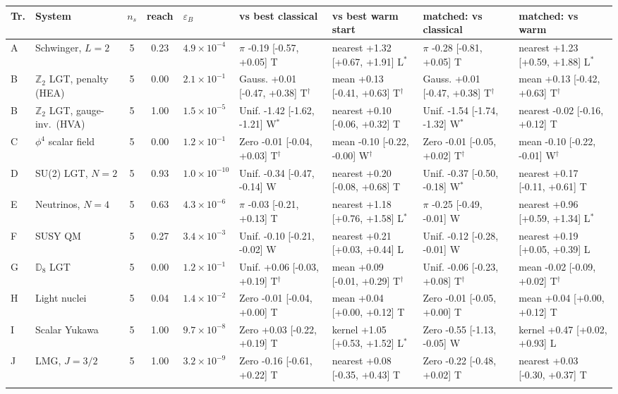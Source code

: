 \begin{tabular}{@{}llcclllll@{}}
\toprule
Tr. & System & $n_s$ & reach & $\varepsilon_B$ & vs best classical & vs best warm start & matched: vs classical & matched: vs warm \\
\midrule
A & Schwinger, $L{=}2$ & 5 & 0.23 & $4.9\!\times\!10^{-4}$ & $\pi$ -0.19 [-0.57, +0.05] T & nearest +1.32 [+0.67, +1.91] L$^\ast$ & $\pi$ -0.28 [-0.81, +0.05] T & nearest +1.23 [+0.59, +1.88] L$^\ast$ \\
B & $\mathbb{Z}_2$ LGT, penalty (HEA) & 5 & 0.00 & $2.1\!\times\!10^{-1}$ & Gauss. +0.01 [-0.47, +0.38] T$^\dagger$ & mean +0.13 [-0.41, +0.63] T$^\dagger$ & Gauss. +0.01 [-0.47, +0.38] T$^\dagger$ & mean +0.13 [-0.42, +0.63] T$^\dagger$ \\
B & $\mathbb{Z}_2$ LGT, gauge-inv.\ (HVA) & 5 & 1.00 & $1.5\!\times\!10^{-5}$ & Unif. -1.42 [-1.62, -1.21] W$^\ast$ & nearest +0.10 [-0.06, +0.32] T & Unif. -1.54 [-1.74, -1.32] W$^\ast$ & nearest -0.02 [-0.16, +0.12] T \\
C & $\phi^4$ scalar field & 5 & 0.00 & $1.2\!\times\!10^{-1}$ & Zero -0.01 [-0.04, +0.03] T$^\dagger$ & mean -0.10 [-0.22, -0.00] W$^\dagger$ & Zero -0.01 [-0.05, +0.02] T$^\dagger$ & mean -0.10 [-0.22, -0.01] W$^\dagger$ \\
D & SU(2) LGT, $N{=}2$ & 5 & 0.93 & $1.0\!\times\!10^{-10}$ & Unif. -0.34 [-0.47, -0.14] W & nearest +0.20 [-0.08, +0.68] T & Unif. -0.37 [-0.50, -0.18] W$^\ast$ & nearest +0.17 [-0.11, +0.61] T \\
E & Neutrinos, $N{=}4$ & 5 & 0.63 & $4.3\!\times\!10^{-6}$ & $\pi$ -0.03 [-0.21, +0.13] T & nearest +1.18 [+0.76, +1.58] L$^\ast$ & $\pi$ -0.25 [-0.49, -0.01] W & nearest +0.96 [+0.59, +1.34] L$^\ast$ \\
F & SUSY QM & 5 & 0.27 & $3.4\!\times\!10^{-3}$ & Unif. -0.10 [-0.21, -0.02] W & nearest +0.21 [+0.03, +0.44] L & Unif. -0.12 [-0.28, -0.01] W & nearest +0.19 [+0.05, +0.39] L \\
G & $\mathbb{D}_8$ LGT & 5 & 0.00 & $1.2\!\times\!10^{-1}$ & Unif. +0.06 [-0.03, +0.19] T$^\dagger$ & mean +0.09 [-0.01, +0.29] T$^\dagger$ & Unif. -0.06 [-0.23, +0.08] T$^\dagger$ & mean -0.02 [-0.09, +0.02] T$^\dagger$ \\
H & Light nuclei & 5 & 0.04 & $1.4\!\times\!10^{-2}$ & Zero -0.01 [-0.04, +0.00] T & mean +0.04 [+0.00, +0.12] T & Zero -0.01 [-0.05, +0.00] T & mean +0.04 [+0.00, +0.12] T \\
I & Scalar Yukawa & 5 & 1.00 & $9.7\!\times\!10^{-8}$ & Zero +0.03 [-0.22, +0.19] T & kernel +1.05 [+0.53, +1.52] L$^\ast$ & Zero -0.55 [-1.13, -0.05] W & kernel +0.47 [+0.02, +0.93] L \\
J & LMG, $J{=}3/2$ & 5 & 1.00 & $3.2\!\times\!10^{-9}$ & Zero -0.16 [-0.61, +0.22] T & nearest +0.08 [-0.35, +0.43] T & Zero -0.22 [-0.48, +0.02] T & nearest +0.03 [-0.30, +0.37] T \\
\botrule
\end{tabular}
